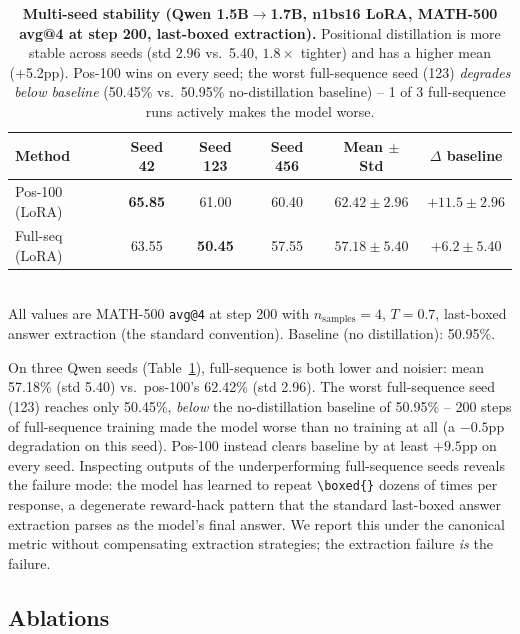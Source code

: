 \documentclass[10pt]{article}
\begin{document}
\begin{table}[t]
\centering
\caption{\textbf{Multi-seed stability (Qwen 1.5B$\to$1.7B, n1bs16 LoRA, MATH-500 avg@4 at step 200, last-boxed extraction).} Positional distillation is more stable across seeds (std 2.96 vs.\ 5.40, $1.8\times$ tighter) and has a higher mean (+5.2pp). Pos-100 wins on every seed; the worst full-sequence seed (123) \emph{degrades below baseline} (50.45\% vs.\ 50.95\% no-distillation baseline) -- 1 of 3 full-sequence runs actively makes the model worse.}
\label{tab:multiseed}
\small
\begin{tabular}{@{}lccccc@{}}
\toprule
\textbf{Method} & \textbf{Seed 42} & \textbf{Seed 123} & \textbf{Seed 456} & \textbf{Mean $\pm$ Std} & \textbf{$\Delta$ baseline} \\
\midrule
Pos-100 (LoRA) & \textbf{65.85} & 61.00 & 60.40 & $\mathbf{62.42 \pm 2.96}$ & $+11.5 \pm 2.96$ \\
Full-seq (LoRA) & 63.55 & \textbf{50.45} & 57.55 & $57.18 \pm 5.40$ & $+6.2 \pm 5.40$ \\
\bottomrule
\end{tabular}
\\[2pt]
{\footnotesize All values are MATH-500 \texttt{avg@4} at step 200 with $n_{\text{samples}}{=}4$, $T{=}0.7$, last-boxed answer extraction (the standard convention). Baseline (no distillation): 50.95\%.}
\end{table}

On three Qwen seeds (Table~\ref{tab:multiseed}), full-sequence is both lower and noisier: mean 57.18\% (std 5.40) vs.\ pos-100's 62.42\% (std 2.96). The worst full-sequence seed (123) reaches only 50.45\%, \emph{below} the no-distillation baseline of 50.95\% -- 200 steps of full-sequence training made the model worse than no training at all (a $-0.5$pp degradation on this seed). Pos-100 instead clears baseline by at least $+9.5$pp on every seed. Inspecting outputs of the underperforming full-sequence seeds reveals the failure mode: the model has learned to repeat \texttt{\textbackslash boxed\{\}} dozens of times per response, a degenerate reward-hack pattern that the standard last-boxed answer extraction parses as the model's final answer. We report this under the canonical metric without compensating extraction strategies; the extraction failure \emph{is} the failure.

\subsection{Ablations}
\label{sec:ablations}
\end{document}
